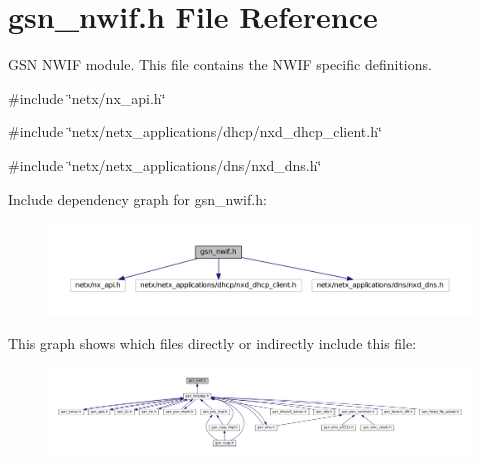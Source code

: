 \hypertarget{a00534}{
\section{gsn\_\-nwif.h File Reference}
\label{a00534}
}


GSN NWIF module. This file contains the NWIF specific definitions.  


{\ttfamily \#include \char`\"{}netx/nx\_\-api.h\char`\"{}}\par
{\ttfamily \#include \char`\"{}netx/netx\_\-applications/dhcp/nxd\_\-dhcp\_\-client.h\char`\"{}}\par
{\ttfamily \#include \char`\"{}netx/netx\_\-applications/dns/nxd\_\-dns.h\char`\"{}}\par
Include dependency graph for gsn\_\-nwif.h:
\nopagebreak
\begin{figure}[H]
\begin{center}
\leavevmode
\includegraphics[width=400pt]{a00769}
\end{center}
\end{figure}
This graph shows which files directly or indirectly include this file:
\nopagebreak
\begin{figure}[H]
\begin{center}
\leavevmode
\includegraphics[width=400pt]{a00770}
\end{center}
\end{figure}
